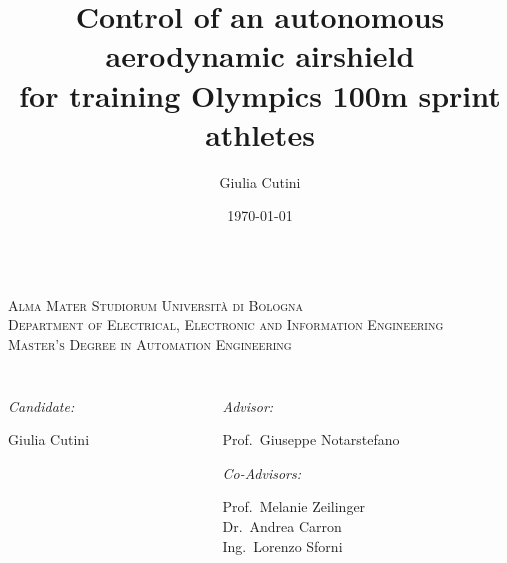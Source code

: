 \documentclass[11pt, aspectratio=169]{beamer}
\title[Control of an autonomous aerodynamic airshield]
  {\Large Control of an autonomous aerodynamic airshield \\
for training Olympics 100m sprint athletes}
\author[Giulia Cutini]{Giulia Cutini}
\institute[University of Bologna]{}
\date{\today}
\makeatletter
\newcommand{\myemph}[1]{\emph{\color{emph@Thesis}#1}}
\makeatother
\begin{document}
\footnotesize


\begin{frame}
\centering

\vspace{0.8cm}
\begin{columns}
\begin{column}{1.1\textwidth}
\centering \footnotesize
\textsc{Alma Mater Studiorum Universit\`{a} di Bologna}\\
\textsc{Department of Electrical, Electronic and Information Engineering}
\\
\vspace{0.2cm}
\textsc{Master's Degree in Automation Engineering}
\end{column}
\end{columns}

\vspace{0.5cm}

\textcolor{blue@Thesis}{\Large \bf \inserttitle}

\vspace{1cm}

\begin{columns}[t]
\begin{column}{0.5\textwidth}
	\myemph{Candidate:}
	
	\hspace{0.5cm} Giulia Cutini
\end{column}

\begin{column}{0.4\textwidth}
	\myemph{Advisor:}
	
		\hspace{0.5cm} Prof.~Giuseppe Notarstefano
		
		\vspace{.4cm}
		\myemph{Co-Advisors:}
	
		\hspace{0.5cm} Prof.~Melanie Zeilinger \\
		\hspace{0.5cm} Dr.~Andrea Carron \\
		\hspace{0.5cm} Ing.~Lorenzo Sforni
\end{column}
	
\end{columns}


\end{frame}
\end{document}
